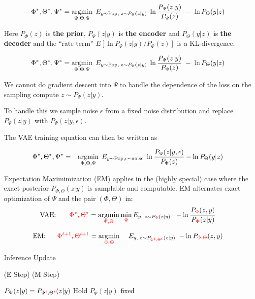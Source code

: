 {

$$\Phi^*,\Theta^*,\Psi^* = \operatorname*{argmin}_{\Phi,\Theta,\Psi}\;E_{y \sim \mathrm{Pop},\;z \sim P_\Psi(z|y)}\;\ln\frac{P_\Psi(z|y)}{P_\Phi(z)} \;-\; \ln P_\Theta(y|z)$$

\vfill
Here $P_\Phi(z)$ is {\bf the prior}, $P_\Psi(z|y)$ is {\bf  the encoder} and $P_\Theta(y|z)$ is {\bf the decoder} and the ``rate term'' $ E\left[\ln P_\Psi(z|y)/P_\Phi(z)\right]$ is a KL-divergence.


$$\Phi^*,\Theta^*,\Psi^* = \operatorname*{argmin}_{\Phi,\Theta,\Psi}\;E_{y \sim \mathrm{Pop},\;z \sim P_\Psi(z|y)}\;\ln\frac{P_\Psi(z|y)}{P_\Phi(z)} \;-\; \ln P_\Theta(y|z)$$

\vfill
We cannot do gradient descent into $\Psi$ to handle the dependence of the loss on the sampling compute $z \sim P_\Psi(z|y)$.

\vfill
To handle this we sample noise $\epsilon$ from a fixed noise distribution and replace $P_\Psi(z|y)$ with $P_\Psi(z|y,\epsilon)$.

\vfill
The VAE training equation can then be written as

\vfill
\begin{eqnarray*}
\Phi^*,\Theta^*,\Psi^* & =  & \operatorname*{argmin}_{\Phi,\Theta,\Psi}\;E_{y\sim\mathrm{Pop},\epsilon\sim\mathrm{noise}}  \;\ln \frac{P_\Psi(z|y,\epsilon)}{P_\Phi(z)}  - \ln P_\Theta(y|z)
\end{eqnarray*}



Expectation Maximimization (EM) applies in the (highly special) case where the exact posterior $P_{\Phi,\Theta}(z|y)$ is samplable and computable.
EM alternates exact optimization of $\Psi$ and the pair $(\Phi,\Theta)$ in:
$$\mbox{VAE:}\;\;\;\;\;\;\; {\color{red} \Phi^*,\Theta^*} = \operatorname*{argmin}_{\color{red} \Phi,\Theta} \min_{\color{red} \Psi} E_{y,\;z \sim P_{\color{red} \Psi}(z|y)}\;\;- \ln \frac{P_{\color{red} \Phi}(z,y)}{P_{\color{red} \Psi}(z|y)}$$

\vfill
$$\mbox{EM:}\;\;\;\;\;\; {\color{red} \Phi^{t+1},\Theta^{t+1}} =  \operatorname*{argmin}_{\color{red} \Phi,\Theta}\;\;\;\;E_{y,\;z \sim P_{\color{red} \Phi^t,\Theta^t}(z|y)}\; - \ln P_{\color{red} \Phi,\Theta}(z,y)$$

\vfill
\centerline{\hspace{1em} Inference \hspace{6em} Update \hspace{2.5em}~}
\centerline{(E Step) \hspace{6em} (M Step) ~}
\centerline{ $P_\Psi(z|y) = P_{\Phi^{\color{red} t},\Theta^{\color{red} t}}(z|y)$ \hspace{2.5em} Hold $P_\Psi(z|y)$ fixed \hspace{0em}~}

}
